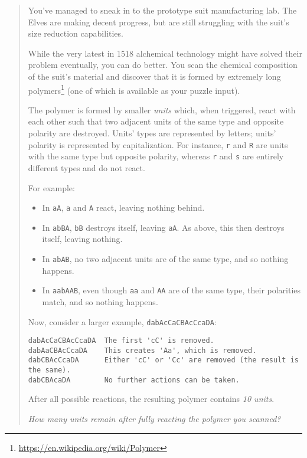 \documentclass[]{article}
\renewcommand{\href}[2]{#2\footnote{\url{#1}}}
\begin{document}
\begin{quote}
You've managed to sneak in to the prototype suit manufacturing lab. The Elves
are making decent progress, but are still struggling with the suit's size
reduction capabilities.

While the very latest in 1518 alchemical technology might have solved their
problem eventually, you can do better. You scan the chemical composition of the
suit's material and discover that it is formed by extremely long
\href{https://en.wikipedia.org/wiki/Polymer}{polymers} (one of which is
{available} as your puzzle input).

The polymer is formed by smaller \emph{units} which, when triggered, react with
each other such that two adjacent units of the same type and opposite polarity
are destroyed. Units' types are represented by letters; units' polarity is
represented by capitalization. For instance, \texttt{r} and \texttt{R} are units
with the same type but opposite polarity, whereas \texttt{r} and \texttt{s} are
entirely different types and do not react.

For example:

\begin{itemize}
\tightlist
\item
  In \texttt{aA}, \texttt{a} and \texttt{A} react, leaving nothing behind.
\item
  In \texttt{abBA}, \texttt{bB} destroys itself, leaving \texttt{aA}. As above,
  this then destroys itself, leaving nothing.
\item
  In \texttt{abAB}, no two adjacent units are of the same type, and so nothing
  happens.
\item
  In \texttt{aabAAB}, even though \texttt{aa} and \texttt{AA} are of the same
  type, their polarities match, and so nothing happens.
\end{itemize}

Now, consider a larger example, \texttt{dabAcCaCBAcCcaDA}:

\begin{verbatim}
dabAcCaCBAcCcaDA  The first 'cC' is removed.
dabAaCBAcCcaDA    This creates 'Aa', which is removed.
dabCBAcCcaDA      Either 'cC' or 'Cc' are removed (the result is the same).
dabCBAcaDA        No further actions can be taken.
\end{verbatim}

After all possible reactions, the resulting polymer contains \emph{10 units}.

\emph{How many units remain after fully reacting the polymer you scanned?}
\end{quote}
\end{document}
